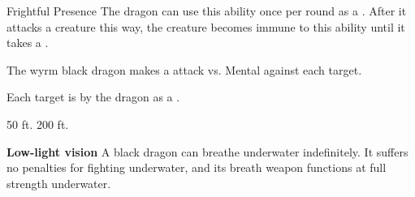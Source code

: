     \begin{freeability}{Frightful Presence}
      The dragon can use this ability once per round as a .
      After it attacks a creature this way, the creature becomes immune to this ability until it takes a .
      \par The wyrm black dragon makes a  attack
        vs. Mental against each target.
    
    \hit Each target is  by the dragon as a .
    \end{freeability}
  
      
       50 ft.
     200 ft.
    \par\noindent\textbf{Low-light vision}
        A black dragon can breathe underwater indefinitely.
        It suffers no penalties for fighting underwater, and its breath weapon functions at full strength underwater.
  

